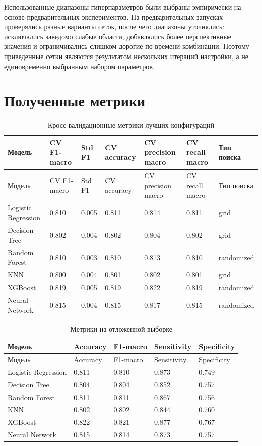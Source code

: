 \documentclass[14pt,a4paper]{extreport}
\begin{document}
Использованные диапазоны гиперпараметров были выбраны эмпирически на основе предварительных экспериментов. На предварительных запусках проверялись разные варианты сеток, после чего диапазоны уточнялись: исключались заведомо слабые области, добавлялись более перспективные значения и ограничивались слишком дорогие по времени комбинации. Поэтому приведенные сетки являются результатом нескольких итераций настройки, а не единовременно выбранным набором параметров.

\section{Полученные метрики}

\scriptsize
\begin{longtable}{lllllll}
\caption{Кросс-валидационные метрики лучших конфигураций}\label{tab:cv_metrics}\\
\toprule
Модель & CV F1-macro & Std F1 & CV accuracy & CV precision macro & CV recall macro & Тип поиска \\
\midrule
\endfirsthead
\toprule
Модель & CV F1-macro & Std F1 & CV accuracy & CV precision macro & CV recall macro & Тип поиска \\
\midrule
\endhead
Logistic Regression & 0.810 & 0.005 & 0.811 & 0.814 & 0.811 & grid \\
Decision Tree & 0.802 & 0.004 & 0.802 & 0.804 & 0.802 & grid \\
Random Forest & 0.810 & 0.003 & 0.810 & 0.813 & 0.810 & randomized \\
KNN & 0.800 & 0.004 & 0.801 & 0.802 & 0.801 & grid \\
XGBoost & 0.819 & 0.005 & 0.819 & 0.822 & 0.819 & randomized \\
Neural Network & 0.815 & 0.004 & 0.815 & 0.817 & 0.815 & randomized \\
\bottomrule
\end{longtable}
\normalsize

\scriptsize
\begin{longtable}{lllll}
\caption{Метрики на отложенной выборке}\label{tab:holdout_metrics}\\
\toprule
Модель & Accuracy & F1-macro & Sensitivity & Specificity \\
\midrule
\endfirsthead
\toprule
Модель & Accuracy & F1-macro & Sensitivity & Specificity \\
\midrule
\endhead
Logistic Regression & 0.811 & 0.810 & 0.873 & 0.749 \\
Decision Tree & 0.804 & 0.804 & 0.852 & 0.757 \\
Random Forest & 0.811 & 0.811 & 0.867 & 0.756 \\
KNN & 0.802 & 0.802 & 0.844 & 0.760 \\
XGBoost & 0.822 & 0.821 & 0.877 & 0.767 \\
Neural Network & 0.815 & 0.814 & 0.873 & 0.757 \\
\bottomrule
\end{longtable}
\normalsize
\end{document}
